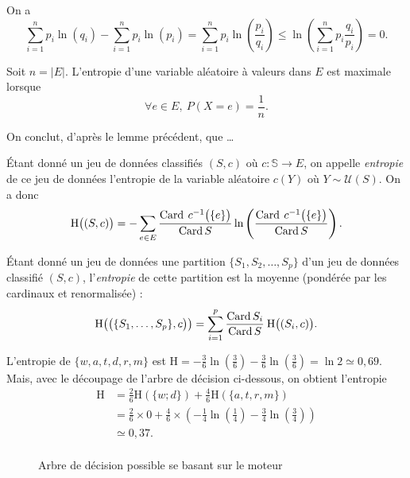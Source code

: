 \begin{prv}
	On a \[
		\sum_{i=1}^n p_i \ln(q_i) - \sum_{i=1}^n p_i \ln(p_i) =
		\sum_{i=1}^n p_i \ln\left( \frac{p_i}{q_i} \right) \le \ln\left( \sum_{i=1}^n p_i \frac{q_i}{p_i} \right) = 0
	.\]
\end{prv}

\begin{prop}
	Soit $n= |E|$. L'entropie d'une variable aléatoire à valeurs dans $E$\/ est maximale lorsque \[
		\forall e \in E,\:P(X = e) = \frac{1}{n}
	.\]
\end{prop}

\begin{prv}
	On conclut, d'après le lemme précédent, que \ldots
\end{prv}

\begin{defn}
	Étant donné un jeu de données classifiés $(S, c)$ où $c : \mathds{S} \to E$, on appelle \textit{entropie} de ce jeu de données l'entropie de la variable aléatoire $c(Y)$\/ où $Y \sim \mathcal{U}(S)$.
	On a donc \[
		\mathrm{H}\big((S,c)\big) = -\sum_{e \in E} \frac{\operatorname{Card}\:c^{-1}\big(\{e\}\big)}{\operatorname{Card} S} \ln\left( \frac{\operatorname{Card}\:c^{-1}\big(\{e\}\big)}{\operatorname{Card} S} \right) 
	.\]
\end{defn}

\begin{defn}
	Étant donné un jeu de données une partition $\{S_1, S_2, \ldots, S_p\}$\/ d'un jeu de données classifié $(S, c)$, l'\textit{entropie} de cette partition est la moyenne (pondérée par les cardinaux et renormalisée) : \[
		\mathrm{H}\big(\big(\{S_1,\ldots,S_p\}, c\big)\big) = \sum_{i=1}^p \frac{\operatorname{Card} S_i}{\operatorname{Card} S}\:\mathrm{H}\big((S_i,c)\big)
	.\]
\end{defn}

L'entropie de $\{w,a,t,d,r,m\}$\/ est $\mathrm{H} = -\frac{3}{6}\ln\left( \frac{3}{6} \right) - \frac{3}{6} \ln\left(\frac{3}{6}\right) = \ln 2 \simeq 0{,}69$.
Mais, avec le découpage de l'arbre de décision ci-dessous, on obtient l'entropie
\begin{align*}
	\mathrm{H} &= \frac{2}{6} \mathrm{H}(\{w;d\}) + \frac{4}{6} \mathrm{H}(\{a,t,r,m\}) \\
	&= \frac{2}{6} \times  0 + \frac{4}{6} \times \left( -\frac{1}{4} \ln\left(\frac{1}{4}\right) - \frac{3}{4} \ln\left( \frac{3}{4} \right) \right) \\
	&\simeq 0{,}37.  \\
\end{align*}
\begin{figure}[H]
	\centering
	\caption{Arbre de décision possible se basant sur le moteur}
\end{figure}

